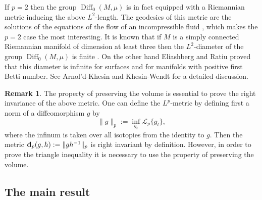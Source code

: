 \documentclass[a4paper,12pt]{amsart}
\def\Diff{\operatorname{Diff}}
\def\Id{\operatorname{Id}}
\theoremstyle{definition}
\newtheorem{rem}[thm]{Remark}
\begin{document}
If $p=2$ then the group $\Diff_0(M,\mu)$ is in fact equipped with a
Riemannian metric inducing the above $L^2$-length.  The geodesics of
this metric are the solutions of the equations of the flow of an
incompressible fluid \cite{Ar}, which makes the $p=2$ case the most
interesting. It is known that if $M$ is a simply connected Riemannian
manifold of dimension at least three then the $L^2$-diameter of the
group $\Diff_0(M,\mu)$ is finite \cite{Sh}. On the other hand
Eliashberg and Ratiu \cite{ER} proved that this diameter is infinite
for surfaces and for manifolds with positive first Betti number.  See
Arnol'd-Khesin \cite{AK} and Khesin-Wendt \cite[Section~3.6]{KW} for
a detailed discussion.

\begin{rem}
The property of preserving the volume is essential
to prove the right invariance of the above metric.
One can define the $L^p$-metric by defining first a norm
of a diffeomorphism $g$ by
$$
\|g\|_{p}:=\inf_{g_t}\mathcal{L}_{p}\{g_t\},
$$
where the infinum is taken over all isotopies from the
identity to $g$. Then the metric
${\bf d}_p(g,h):=\|gh^{-1}\|_p$ is right invariant by
definition. However, in order to prove the triangle
inequality it is necessary to use the property of
preserving the volume.
\end{rem}



\subsection{The main result}


\end{document}
